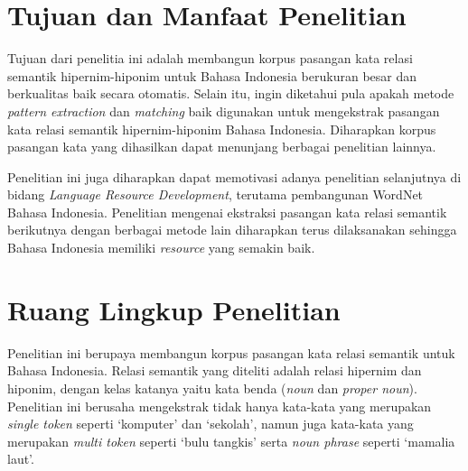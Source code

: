 \section{Tujuan dan Manfaat Penelitian}
Tujuan dari penelitia ini adalah membangun korpus pasangan kata relasi semantik hipernim-hiponim untuk Bahasa Indonesia berukuran besar dan berkualitas baik secara otomatis. Selain itu, ingin diketahui pula apakah metode \textit{pattern extraction} dan \textit{matching} baik digunakan untuk mengekstrak pasangan kata relasi semantik hipernim-hiponim Bahasa Indonesia. Diharapkan korpus pasangan kata yang dihasilkan dapat menunjang berbagai penelitian lainnya.

Penelitian ini juga diharapkan dapat memotivasi adanya penelitian selanjutnya di bidang \textit{Language Resource Development}, terutama pembangunan WordNet Bahasa Indonesia. Penelitian mengenai ekstraksi pasangan kata relasi semantik berikutnya dengan berbagai metode lain diharapkan terus dilaksanakan sehingga Bahasa Indonesia memiliki \textit{resource} yang semakin baik.

%
\section{Ruang Lingkup Penelitian}
Penelitian ini berupaya membangun korpus pasangan kata relasi semantik untuk Bahasa Indonesia. Relasi semantik yang diteliti adalah relasi hipernim dan hiponim, dengan kelas katanya yaitu kata benda (\textit{noun} dan \textit{proper noun}). Penelitian ini berusaha mengekstrak tidak hanya kata-kata yang merupakan \textit{single token} seperti `komputer' dan `sekolah', namun juga kata-kata yang merupakan \textit{multi token} seperti `bulu tangkis' serta \textit{noun phrase} seperti `mamalia laut'.
%

